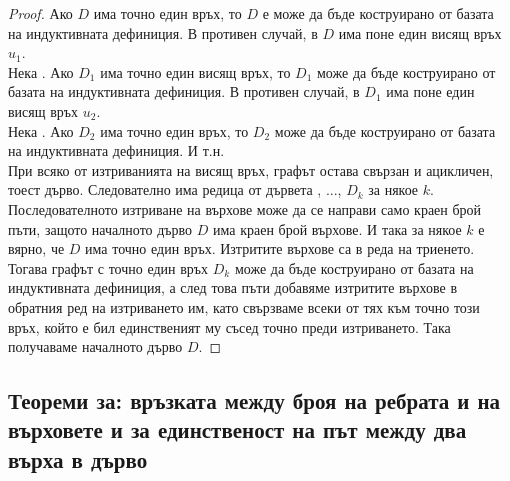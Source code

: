 \begin{proof}
    Ако \(D\) има точно един връх, то \(D\) е може да бъде коструирано от базата на индуктивната дефиниция. В 
    противен случай, в \(D\) има поне един висящ връх \(u_1\). \\
    Нека . Ако \(D_1\) има точно един висящ връх, то \(D_1\) може да бъде коструирано 
    от базата на индуктивната дефиниция. В противен случай, в \(D_1\) има поне един висящ връх \(u_2\). \\
    Нека . Ако \(D_2\) има точно един връх, то \(D_2\) може да бъде коструирано от
    базата на индуктивната дефиниция. И т.н. \\
    При всяко от изтриванията на висящ връх, графът остава свързан и ацикличен, тоест дърво. Следователно 
    има редица от дървета , ..., \(D_k\) за някое \(k\). Последователното изтриване на 
    върхове може да се направи само краен брой пъти, защото началното дърво \(D\) има краен брой върхове. 
    И така за някое \(k\) е вярно, че \(D\) има точно един връх. Изтритите върхове са  в 
    реда на триенето. Тогава графът с точно един връх \(D_k\) може да бъде коструирано от базата на 
    индуктивната дефиниция, а след това  пъти добавяме изтритите върхове в обратния ред 
    на изтриването им, като свързваме всеки от тях към точно този връх, който е бил единственият му съсед 
    точно преди изтриването. Така получаваме началното дърво \(D\). 
\end{proof}

\subsection{Теореми за: връзката между броя на ребрата и на върховете и за единственост на път между два върха в дърво}

